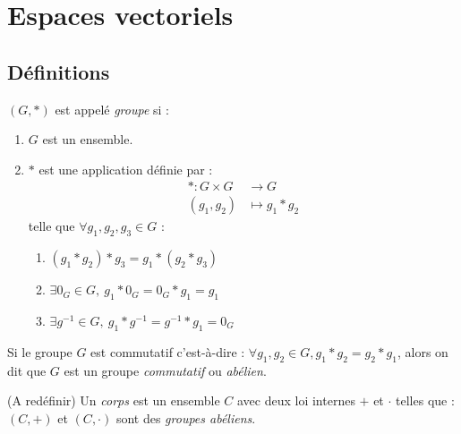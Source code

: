 \chapter{Espaces vectoriels}\label{chap:espaces_vectoriels}

\section{Définitions}
\begin{definition}[Groupe]
    $(G, *)$ est appelé \emph{groupe} si :
    \begin{enumerate}
        \item $G$ est un ensemble.
        \item \og $*$ \fg est une application définie par :
        \begin{align*}
            * : G \times G &\to G \\
            (g_1, g_2) &\mapsto g_1 * g_2
        \end{align*}
        telle que $\forall g_1, g_2, g_3 \in G$ :
        \begin{multicols}{2}
            \begin{enumerate}
                \item $(g_1 * g_2) * g_3 = g_1 * (g_2 * g_3)$
                \item $\exists 0_G \in G,\ g_1 * 0_G = 0_G * g_1 = g_1$
                \item $\exists g^{-1} \in G,\ g_1 * g^{-1} = g^{-1} * g_1 = 0_G$
            \end{enumerate}
        \end{multicols}
    \end{enumerate}
    Si le groupe $G$ est commutatif c'est-à-dire : $\forall g_1, g_2 \in G, g_1 * g_2 = g_2 * g_1$, alors on dit que $G$ est un groupe \emph{commutatif} ou \emph{abélien}.
\end{definition}

\begin{definition}[Corps] %
    (A redéfinir)
    Un \emph{corps} est un ensemble $C$ avec deux loi internes \og $+$ \fg et \og $\cdot$ \fg telles que :
    $(C, +)$ et $(C, \cdot)$ sont des \emph{groupes abéliens}.
\end{definition}

